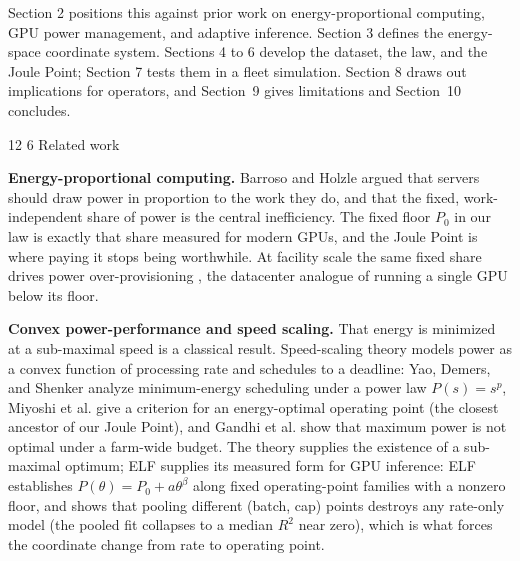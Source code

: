 \documentclass[3p,twocolumn]{elsarticle}
\makeatletter
\renewcommand\section{\@startsection{section}{1}{\z@}%
           {12\p@ \@plus 4\p@ \@minus 4\p@}%
           {6\p@ \@plus 4\p@ \@minus 3\p@}%
           {\normalsize\bfseries\boldmath}}
\makeatother
\begin{document}
Section 2 positions this against prior work on energy-proportional computing, GPU power management, and
adaptive inference. Section 3 defines the energy-space coordinate system. Sections 4 to 6 develop the dataset,
the law, and the Joule Point; Section 7 tests them in a fleet simulation. Section 8 draws out implications for
operators, and Section~9 gives limitations and Section~10 concludes.

\section{Related work}\label{related-work}

\textbf{Energy-proportional computing.} Barroso and Holzle \cite{ref1} argued that servers should draw power in
proportion to the work they do, and that the fixed, work-independent share of power is the central
inefficiency. The fixed floor {\(P_0\)} in our law is exactly that share measured for modern
GPUs, and the Joule Point is where paying it stops being worthwhile. At facility scale the same fixed share
drives power over-provisioning \cite{ref15}, the datacenter analogue of running a single GPU below its floor.

\textbf{Convex power-performance and speed scaling.} That energy is minimized at a sub-maximal speed is a
classical result. Speed-scaling theory models power as a convex function of processing rate and schedules to a
deadline: Yao, Demers, and Shenker \cite{ref35} analyze minimum-energy scheduling under a power law
{\(P(s)=s^p\)}, Miyoshi et al. \cite{ref36} give a criterion for an energy-optimal operating point (the
closest ancestor of our Joule Point), and Gandhi et al. \cite{ref37} show that maximum power is not optimal under a
farm-wide budget. The theory supplies the existence of a sub-maximal optimum; ELF supplies its measured form for GPU
inference: ELF establishes {\(P(\theta)=P_0+a\theta^{\beta}\)} along fixed operating-point families with a
nonzero floor, and shows that pooling different (batch, cap) points destroys any rate-only model (the pooled fit
collapses to a median {\(R^2\)} near zero), which is what forces the coordinate change from rate to
operating point.
\end{document}
